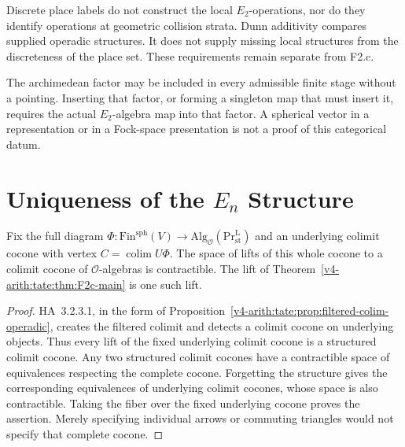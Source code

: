 \begin{remark}
\label{v4-arith:tate:rem:archimedean-vs-finite-E2}
Discrete place labels do not construct the local \(E_2\)-operations,
nor do they identify operations at geometric collision strata.
Dunn additivity compares supplied operadic structures. It does
not supply missing local structures from the discreteness of the
place set. These requirements remain separate from F2.c.
\end{remark}

\begin{remark}
\label{v4-arith:tate:rem:archimedean}
The archimedean factor may be included in every admissible finite
stage without a pointing. Inserting that factor, or forming a
singleton map that must insert it, requires the actual
\(E_2\)-algebra map into that factor. A spherical vector in a
representation or in a Fock-space presentation is not a proof
of this categorical datum.
\end{remark}

\section{Uniqueness of the \(E_n\) Structure}
\label{v4-arith:tate:uniqueness}

\begin{proposition}
\label{v4-arith:tate:prop:uniqueness}
Fix the full diagram
\(\Phi:\mathrm{Fin}^{\mathrm{sph}}(V)\to
\mathrm{Alg}_{\mathcal O}(\mathrm{Pr}^{\mathrm L}_{\mathrm{st}})\)
and an underlying colimit cocone with vertex
\(C=\operatorname*{colim}U\Phi\). The space of lifts of this whole
cocone to a colimit cocone of \(\mathcal O\)-algebras is
contractible. The lift of
Theorem~\ref{v4-arith:tate:thm:F2c-main} is one such lift.
\end{proposition}

\begin{proof}
HA~3.2.3.1, in the form of
Proposition~\ref{v4-arith:tate:prop:filtered-colim-operadic}, creates
the filtered colimit and detects a colimit cocone on underlying
objects. Thus every lift of the fixed underlying colimit cocone
is a structured colimit cocone. Any two structured colimit
cocones have a contractible space of equivalences respecting
the complete cocone. Forgetting the structure gives the
corresponding equivalences of underlying colimit cocones, whose
space is also contractible. Taking the fiber over the fixed
underlying cocone proves the assertion. Merely specifying
individual arrows or commuting triangles would not specify that
complete cocone.
\end{proof}

